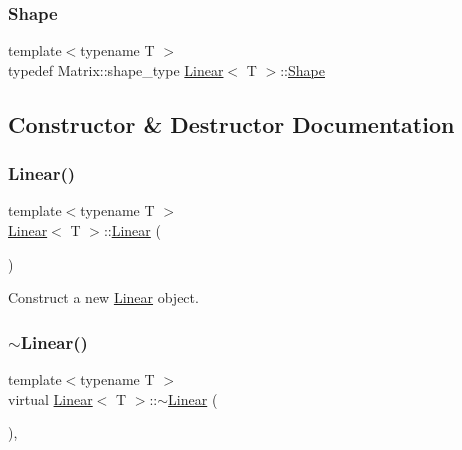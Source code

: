 \mbox{\label{class_linear_afeccdcd7a158d0fe034436e4eafae066}} 
\subsubsection{\texorpdfstring{Shape}{Shape}}
{\footnotesize\ttfamily template$<$typename T $>$ \\
typedef Matrix\+::shape\+\_\+type \mbox{\hyperlink{class_linear}{Linear}}$<$ T $>$\+::\mbox{\hyperlink{class_layer_a8313f42d2292d12dd5d40cc115636693}{Shape}}}



\subsection{Constructor \& Destructor Documentation}
\mbox{\label{class_linear_a905089a6472d97cc8b1d201fdd3deef9}} 
\subsubsection{\texorpdfstring{Linear()}{Linear()}\hspace{0.1cm}{\footnotesize\ttfamily [1/2]}}
{\footnotesize\ttfamily template$<$typename T $>$ \\
\mbox{\hyperlink{class_linear}{Linear}}$<$ T $>$\+::\mbox{\hyperlink{class_linear}{Linear}} (\begin{DoxyParamCaption}{ }\end{DoxyParamCaption})\hspace{0.3cm}{\ttfamily [default]}}



Construct a new \mbox{\hyperlink{class_linear}{Linear}} object. 

\mbox{\label{class_linear_a42109067fe1d9da36148f7c4f330b564}} 
\subsubsection{\texorpdfstring{$\sim$Linear()}{~Linear()}}
{\footnotesize\ttfamily template$<$typename T $>$ \\
virtual \mbox{\hyperlink{class_linear}{Linear}}$<$ T $>$\+::$\sim$\mbox{\hyperlink{class_linear}{Linear}} (\begin{DoxyParamCaption}{ }\end{DoxyParamCaption})\hspace{0.3cm}{\ttfamily [virtual]}, {\ttfamily [default]}}




